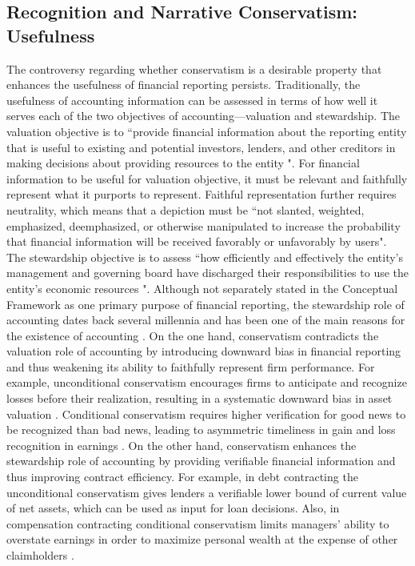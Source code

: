 \documentclass[a4paper]{article}
\begin{document}
\begin{spacing}{2}
\subsection{Recognition and Narrative Conservatism: Usefulness}
The controversy regarding whether conservatism is a desirable property that enhances the usefulness of financial reporting persists. Traditionally, the usefulness of accounting information can be assessed in terms of how well it serves each of the two objectives of accounting---valuation and stewardship. The valuation objective is to ``provide financial information about the reporting entity that is useful to existing and potential investors, lenders, and other creditors in making decisions about providing resources to the entity \citep[OB2]{fasbConceptualFrameworkFinancial2018b}". For financial information to be useful for valuation objective, it must be relevant and faithfully represent what it purports to represent. Faithful representation further requires neutrality, which means that a depiction must be ``not slanted, weighted, emphasized, deemphasized, or otherwise manipulated to increase the probability that financial information will be received favorably or unfavorably by users". The stewardship objective is to assess ``how efficiently and effectively the entity's management and governing board have discharged their responsibilities to use the entity's economic resources \cite[OB4]{fasbConceptualFrameworkFinancial2018b}". Although not separately stated in the Conceptual Framework as one primary purpose of financial reporting, the stewardship role of accounting dates back several millennia and has been one of the main reasons for the existence of accounting \citep{lennardStewardshipObjectivesFinancial2007, murphyDiscoursesSurroundingEvolution2013, pelgerPracticesStandardsettingAnalysis2016}. On the one hand, conservatism contradicts the valuation role of accounting by introducing downward bias in financial reporting and thus weakening its ability to faithfully represent firm performance. For example, unconditional conservatism encourages firms to anticipate and recognize losses before their realization, resulting in a systematic downward bias in asset valuation \citep*[e.g.,][]{wattsPositiveAccountingTheory1986}. Conditional conservatism requires higher verification for good news to be recognized than bad news, leading to asymmetric timeliness in gain and loss recognition in earnings \citep*[e.g.,][]{basuConservatismPrincipleAsymmetric1997}. On the other hand, conservatism enhances the stewardship role of accounting by providing verifiable financial information and thus improving contract efficiency. For example, in debt contracting the unconditional conservatism gives lenders a verifiable lower bound of current value of net assets, which can be used as input for loan decisions. Also, in compensation contracting conditional conservatism limits managers' ability to overstate earnings in order to maximize personal wealth at the expense of other claimholders \citep*[e.g.,][]{wattsConservatismAccountingPart2003}.


\end{spacing}
\end{document}
